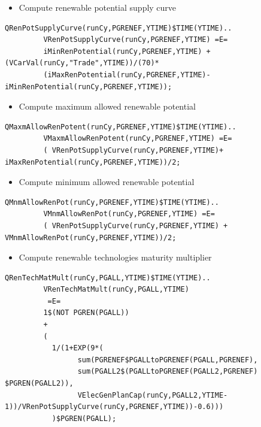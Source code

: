 \documentclass[a4paper,]{scrartcl}
\providecommand{\tightlist}{%
  \setlength{\itemsep}{0pt}\setlength{\parskip}{0pt}}
\begin{document}
\begin{itemize}
\tightlist
\item
  Compute renewable potential supply curve
\end{itemize}

\begin{lstlisting}
QRenPotSupplyCurve(runCy,PGRENEF,YTIME)$TIME(YTIME)..
         VRenPotSupplyCurve(runCy,PGRENEF,YTIME) =E=
         iMinRenPotential(runCy,PGRENEF,YTIME) +(VCarVal(runCy,"Trade",YTIME))/(70)*
         (iMaxRenPotential(runCy,PGRENEF,YTIME)-iMinRenPotential(runCy,PGRENEF,YTIME));
\end{lstlisting}

\begin{itemize}
\tightlist
\item
  Compute maximum allowed renewable potential
\end{itemize}

\begin{lstlisting}
QMaxmAllowRenPotent(runCy,PGRENEF,YTIME)$TIME(YTIME)..      
         VMaxmAllowRenPotent(runCy,PGRENEF,YTIME) =E=
         ( VRenPotSupplyCurve(runCy,PGRENEF,YTIME)+ iMaxRenPotential(runCy,PGRENEF,YTIME))/2;
\end{lstlisting}

\begin{itemize}
\tightlist
\item
  Compute minimum allowed renewable potential
\end{itemize}

\begin{lstlisting}
QMnmAllowRenPot(runCy,PGRENEF,YTIME)$TIME(YTIME)..  
         VMnmAllowRenPot(runCy,PGRENEF,YTIME) =E=
         ( VRenPotSupplyCurve(runCy,PGRENEF,YTIME) + VMnmAllowRenPot(runCy,PGRENEF,YTIME))/2;
\end{lstlisting}

\begin{itemize}
\tightlist
\item
  Compute renewable technologies maturity multiplier
\end{itemize}

\begin{lstlisting}
QRenTechMatMult(runCy,PGALL,YTIME)$TIME(YTIME)..
         VRenTechMatMult(runCy,PGALL,YTIME)
          =E=
         1$(NOT PGREN(PGALL))
         +
         (
           1/(1+EXP(9*(
                 sum(PGRENEF$PGALLtoPGRENEF(PGALL,PGRENEF),
                 sum(PGALL2$(PGALLtoPGRENEF(PGALL2,PGRENEF) $PGREN(PGALL2)),
                 VElecGenPlanCap(runCy,PGALL2,YTIME-1))/VRenPotSupplyCurve(runCy,PGRENEF,YTIME))-0.6)))
           )$PGREN(PGALL);  
\end{lstlisting}
\end{document}
